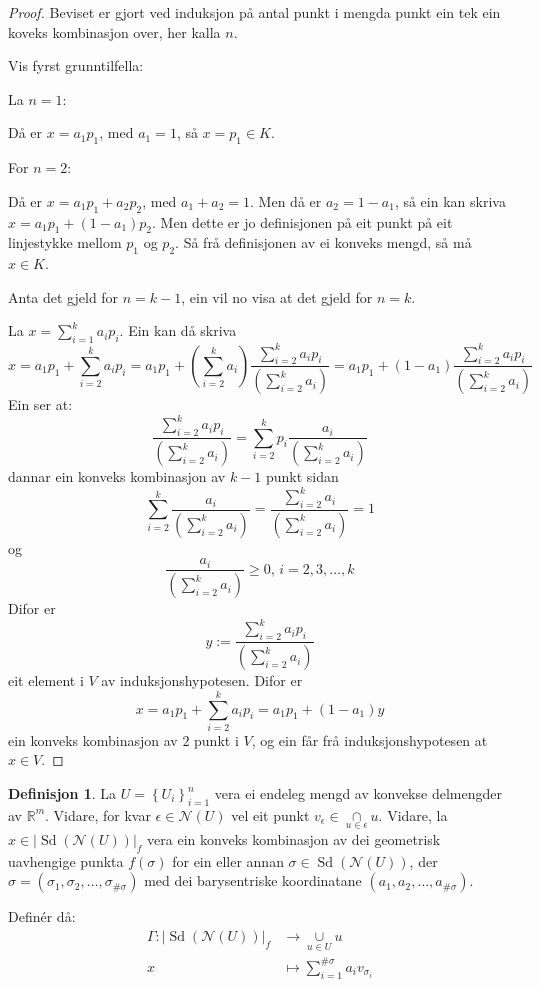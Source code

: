 \documentclass[a4paper, 12pt, norsk]{article}
\theoremstyle{plain}
\theoremstyle{definition}
\newtheorem{definition}[theorem]{Definisjon}
\newcommand{\Rb}{\mathbb{R}}
\newcommand{\Nc}{\mathcal{N}}
\newcommand{\intersect}{ \mathop{\cap}\limits }
\newcommand{\union}{ \mathop{\cup}\limits }
\newcommand{\gr}[1]{ \lvert #1 \rvert } %
\newcommand{\set}[1]{ \left\{ #1 \right\} } %
\newcommand{\tuple}[1]{ \left( #1 \right) } %
\DeclareMathOperator{\Sd}{Sd} %
\begin{document}
\begin{proof}
	Beviset er gjort ved induksjon på antal punkt i mengda punkt ein tek ein koveks kombinasjon over, her kalla \( n \).

	Vis fyrst grunntilfella:

	La \( n = 1 \):
	
	Då er \( x = a_1 p_1 \), med \( a_1 = 1 \), så \( x = p_1 \in K \).
	
	For \( n = 2 \):

	Då er \( x = a_1 p_1 + a_2 p_2 \), med \( a_1 + a_2 = 1 \). Men då er \( a_2 = 1 - a_1 \), så ein kan skriva \( x = a_1 p_1 + (1-a_1) p_2 \). Men dette er jo definisjonen på eit punkt på eit linjestykke mellom \( p_1 \) og \( p_2 \). Så frå definisjonen av ei konveks mengd, så må \( x \in K \).

	Anta det gjeld for \( n = k-1 \), ein vil no visa at det gjeld for \( n = k \).

	La \( x = \sum_{i=1}^k a_i p_i \). Ein kan då skriva
	\[ 
		x = a_1 p_1 + \sum_{i=2}^k a_i p_i = a_1 p_1 + (\sum_{i=2}^k a_i) \frac{\sum_{i=2}^k a_i p_i}{(\sum_{i=2}^k a_i)} = a_1 p_1 + (1-a_1) \frac{\sum_{i=2}^k a_i p_i}{(\sum_{i=2}^k a_i)}
	\]
	Ein ser at:
	\[
		\frac{\sum_{i=2}^k a_i p_i}{(\sum_{i=2}^k a_i)} = \sum_{i=2}^k p_i\frac{a_i}{(\sum_{i=2}^k a_i)}
	\]
	dannar ein konveks kombinasjon av \( k-1 \) punkt sidan
	\[
		\sum_{i=2}^k \frac{a_i}{(\sum_{i=2}^k a_i)} = \frac{\sum_{i=2}^k a_i}{(\sum_{i=2}^k a_i)} = 1
	\]
	og
	\[
		\frac{a_i}{(\sum_{i=2}^k a_i)} \geq 0, \, i=2,3,\dots,k
	\]
	Difor er
	\[
		y := \frac{\sum_{i=2}^k a_i p_i}{(\sum_{i=2}^k a_i)}
	\]
	eit element i \( V \) av induksjonshypotesen. Difor er
	\[
		x = a_1 p_1 + \sum_{i=2}^k a_i p_i = a_1 p_1 + (1-a_1) y
	\]
	ein konveks kombinasjon av \( 2 \) punkt i \( V \), og ein får frå induksjonshypotesen at \( x \in V \).
\end{proof}

\begin{definition} \label{thm:Gamma}
	La \( U = \set{U_i}_{i=1}^n \) vera ei endeleg mengd av konvekse delmengder av \( \Rb^m \). Vidare, for kvar \( \epsilon \in \Nc(U) \) vel eit punkt \( v_\epsilon \in \intersect_{u \in \epsilon} u \). Vidare, la \( x \in \gr{\Sd(\Nc(U))}_f \) vera ein konveks kombinasjon av dei geometrisk uavhengige punkta \( f(\sigma) \) for ein eller annan \( \sigma \in \Sd(\Nc(U)) \), der \( \sigma = \tuple{\sigma_1, \sigma_2, \dots, \sigma_{\#\sigma}} \) med dei barysentriske koordinatane \( \tuple{a_1, a_2, \dots, a_{\#\sigma}} \).
	
	Definér då:
	\begin{align*}
		\Gamma : \gr{\Sd(\Nc(U))}_f &\to \union_{u \in U} u \\
		x &\mapsto \sum_{i=1}^{\#\sigma} a_i v_{\sigma_i}
	\end{align*}
\end{definition}
\end{document}
